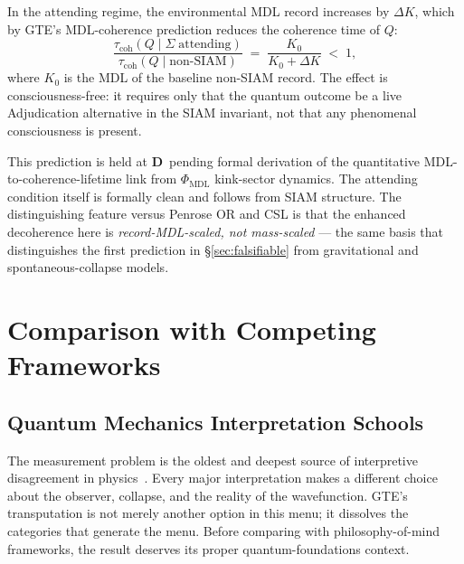 \documentclass[11pt]{article}
\theoremstyle{remark}
\newcommand{\CatD}{\textbf{D}}
\begin{document}
In the attending regime, the environmental MDL record increases by $\Delta K$, which
by GTE's MDL-coherence prediction reduces the coherence time of $Q$:
\[
  \frac{\tau_\text{coh}(Q \mid \Sigma\;\text{attending})}
       {\tau_\text{coh}(Q \mid \text{non-SIAM})}
  \;=\; \frac{K_0}{K_0 + \Delta K} \;<\; 1,
\]
where $K_0$ is the MDL of the baseline non-SIAM record. The effect is
consciousness-free: it requires only that the quantum outcome be a live Adjudication
alternative in the SIAM invariant, not that any phenomenal consciousness is present.

\medskip
This prediction is held at \CatD\ pending formal derivation of the quantitative
MDL-to-coherence-lifetime link from $\Phi_\text{MDL}$ kink-sector dynamics. The
attending condition itself is formally clean and follows from SIAM structure.
The distinguishing feature versus Penrose OR and CSL is that the enhanced decoherence
here is \emph{record-MDL-scaled, not mass-scaled} --- the same basis that
distinguishes the first prediction in §\ref{sec:falsifiable} from gravitational and
spontaneous-collapse models.


\section{Comparison with Competing Frameworks}\label{sec:comparison}

\subsection{Quantum Mechanics Interpretation Schools}\label{sec:qm-schools}

The measurement problem is the oldest and deepest source of interpretive disagreement
in physics~\cite{vonNeumann1955,Bell1964}. Every major interpretation makes a different
choice about the observer, collapse, and the reality of the wavefunction. GTE's
transputation is not merely another option in this menu; it dissolves the categories
that generate the menu. Before comparing with philosophy-of-mind frameworks, the result
deserves its proper quantum-foundations context.
\end{document}
